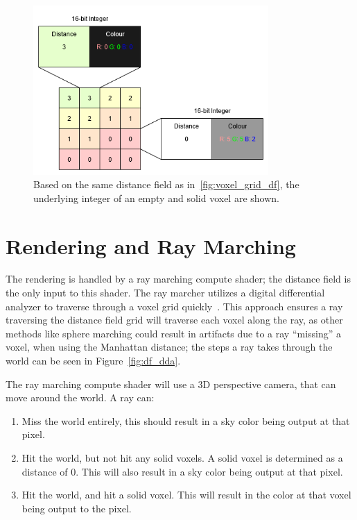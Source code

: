 \begin{figure}[htbp]
    \centering
    \includegraphics[width=0.8\textwidth]{figures/df_repr.drawio.png}
    \caption{Based on the same distance field as in~\ref{fig:voxel_grid_df}, the underlying integer of an empty and
        solid voxel are shown.}
    \label{fig:df_repr}
\end{figure}

\FloatBarrier

\section{Rendering and Ray Marching}\label{sec:ray_marching}
The rendering is handled by a ray marching compute shader; the distance field is the only input to this shader. The ray
marcher utilizes a digital differential analyzer to traverse through a voxel grid quickly~\cite{amanatides1987fast}.
This approach ensures a ray traversing the distance field grid will traverse each voxel along the ray, as other methods
like sphere marching could result in artifacts due to a ray ``missing'' a voxel, when using the Manhattan distance; the
steps a ray takes through the world can be seen in Figure~\ref{fig:df_dda}.

The ray marching compute shader will use a 3D perspective camera, that can move around the world. A ray can:

\begin{enumerate}
    \item Miss the world entirely, this should result in a sky color being output at that pixel.
    \item Hit the world, but not hit any solid voxels. A solid voxel is determined as a distance of 0. This will also
          result in a sky color being output at that pixel.
    \item Hit the world, and hit a solid voxel. This will result in the color at that voxel being output to the pixel.
\end{enumerate}

